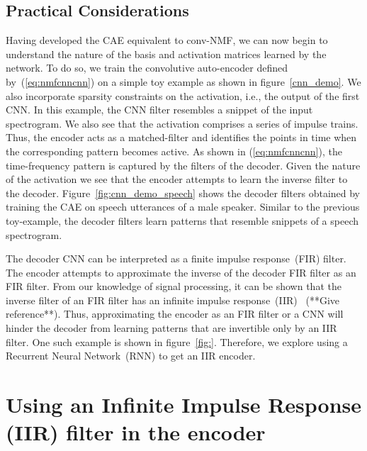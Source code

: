 \documentclass{article}
\begin{document}
\subsection{Practical Considerations}
\label{subsec:practical}
Having developed the CAE equivalent to conv-NMF, we can now begin to understand the nature of the basis and activation matrices learned by the network. To do so, we train the convolutive auto-encoder defined by~(\ref{eq:nmfcnncnn}) on a simple toy example as shown in figure~\ref{cnn_demo}. We also incorporate sparsity constraints on the activation, i.e., the output of the first CNN. In this example, the CNN filter resembles a snippet of the input spectrogram. We also see that the activation comprises a series of impulse trains. Thus, the encoder acts as a matched-filter and identifies the points in time when the corresponding pattern becomes active. As shown in (\ref{eq:nmfcnncnn}), the time-frequency pattern is captured by the filters of the decoder. Given the nature of the activation we see that the encoder attempts to learn the inverse filter to the decoder. Figure~\ref{fig:cnn_demo_speech} shows the decoder filters obtained by training the CAE on speech utterances of a male speaker. Similar to the previous toy-example, the decoder filters learn patterns that resemble snippets of a speech spectrogram. 

The decoder CNN can be interpreted as a finite impulse response~(FIR) filter. The encoder attempts to approximate the inverse of the decoder FIR filter as an FIR filter. From our knowledge of signal processing, it can be shown that the inverse filter of an FIR filter has an infinite impulse response~(IIR)~\cite{} (**Give reference**). Thus, approximating the encoder as an FIR filter or a CNN will hinder the decoder from learning patterns that are invertible only by an IIR filter. One such example is shown in figure~\ref{fig:}. Therefore, we explore using a Recurrent Neural Network~(RNN) to get an IIR encoder.

\section{Using an Infinite Impulse Response (IIR) filter in the encoder}
\label{sec:rnncnn}

\end{document}
